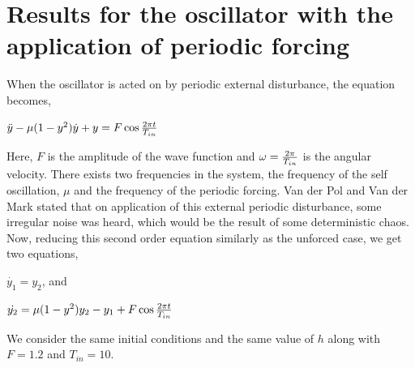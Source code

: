 \documentclass{article}
\begin{document}
\section{Results for the oscillator with the application of periodic forcing}
When the oscillator is acted on by periodic external disturbance, the equation becomes,
\begin{center}
$\ddot{y}-\mu (1-y^2)\dot{y}+y=F\cos{2\pi t \over T_{in}}$
\end{center}
Here, $F$ is the amplitude of the wave function and $\omega={2\pi \over T_{in}}$ is the angular velocity. There exists two frequencies in the system, the frequency of the self oscillation, $\mu$ and the frequency of the periodic forcing. Van der Pol and Van der Mark stated that on application of this external periodic disturbance, some irregular noise was heard, which would be the result of some deterministic chaos. Now, reducing this second order equation similarly as the unforced case, we get two equations,
\begin{center}
$\dot{y_1}=y_2$, and \\ \par
$\dot{y_2}=\mu (1-y^2)y_2-y_1+F\cos{2\pi t \over T_{in}}$
\end{center}
We consider the same initial conditions and the same value of $h$ along with $F=1.2$ and $T_{in}=10$.
\end{document}

